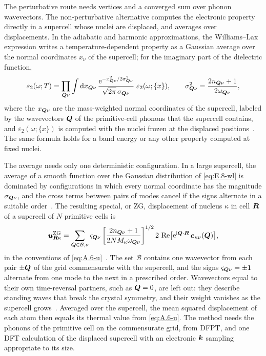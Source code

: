 The perturbative route needs vertices and a converged sum over phonon wavevectors. The non-perturbative alternative computes the electronic property directly in a supercell whose nuclei are displaced, and averages over displacements. In the adiabatic and harmonic approximations, the Williams--Lax expression writes a temperature-dependent property as a Gaussian average over the normal coordinates $x_\nu$ of the supercell; for the imaginary part of the dielectric function,
\begin{equation}
  \varepsilon_2(\omega;T) = \prod_{\bm{Q}\nu}\int\mathrm{d} x_{\bm{Q}\nu}\,\frac{\mathrm{e}^{-x_{\bm{Q}\nu}^2/2\sigma_{\bm{Q}\nu}^2}}{\sqrt{2\pi}\,\sigma_{\bm{Q}\nu}}\;\varepsilon_2(\omega;\{x\}), \qquad \sigma_{\bm{Q}\nu}^2 = \frac{2n_{\bm{Q}\nu} + 1}{2\omega_{\bm{Q}\nu}} ,
  \label{eq:E.8-wl}
\end{equation}
where the $x_{\bm{Q}\nu}$ are the mass-weighted normal coordinates of the supercell, labeled by the wavevectors $\bm{Q}$ of the primitive-cell phonons that the supercell contains, and $\varepsilon_2(\omega;\{x\})$ is computed with the nuclei frozen at the displaced positions~\cite[Eqs.~(3) and~(4), with mass-weighted coordinates]{zacharias2016one}. The same formula holds for a band energy or any other property computed at fixed nuclei.

The average needs only one deterministic configuration. In a large supercell, the average of a smooth function over the Gaussian distribution of \cref{eq:E.8-wl} is dominated by configurations in which every normal coordinate has the magnitude $\sigma_{\bm{Q}\nu}$, and the cross terms between pairs of modes cancel if the signs alternate in a suitable order~\cite[Sect.~III]{zacharias2016one}. The resulting special, or ZG, displacement of nucleus $\kappa$ in cell $\bm{R}$ of a supercell of $N$ primitive cells is
\begin{equation}
  \bm{u}^{\mathrm{ZG}}_{\bm{R}\kappa} = \sum_{\bm{Q}\in\mathcal{B},\nu}\varsigma_{\bm{Q}\nu}\left[\frac{2n_{\bm{Q}\nu} + 1}{2NM_\kappa\omega_{\bm{Q}\nu}}\right]^{1/2}2\,\operatorname{Re}\bigl[\mathrm{e}^{\mathrm{i}\bm{Q}\cdot\bm{R}}\,\bm{e}_{\kappa\nu}(\bm{Q})\bigr] ,
  \label{eq:E.8-zg}
\end{equation}
in the conventions of \cref{eq:A.6-u}~\cite[Eq.~(2)]{zacharias2020theory}. The set $\mathcal{B}$ contains one wavevector from each pair $\pm\bm{Q}$ of the grid commensurate with the supercell, and the signs $\varsigma_{\bm{Q}\nu} = \pm1$ alternate from one mode to the next in a prescribed order. Wavevectors equal to their own time-reversal partners, such as $\bm{Q} = 0$, are left out: they describe standing waves that break the crystal symmetry, and their weight vanishes as the supercell grows~\cite[Sects.~II and~VII\,B]{zacharias2020theory}. Averaged over the supercell, the mean squared displacement of each atom then equals its thermal value from \cref{eq:A.6-u}. The method needs the phonons of the primitive cell on the commensurate grid, from DFPT, and one DFT calculation of the displaced supercell with an electronic $\bm{k}$ sampling appropriate to its size.

